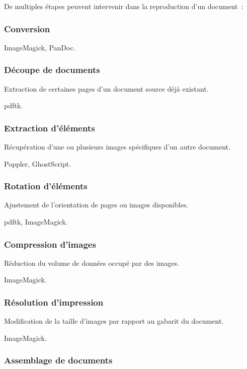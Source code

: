 De multiples étapes peuvent intervenir dans la reproduction d’un document :

\subsubsection{Conversion}

ImageMagick, PanDoc.

\subsubsection{Découpe de documents}

Extraction de certaines pages d’un document source déjà existant.

\gls{pdftk}.

\subsubsection{Extraction d’éléments}

Récupération d’une ou plusieurs images spécifiques d’un autre document.

Poppler, GhostScript.

\subsubsection{Rotation d’éléments}

Ajustement de l’orientation de pages ou images disponibles.

\gls{pdftk}, ImageMagick.

\subsubsection{Compression d’images}

Réduction du volume de données occupé par des images.

ImageMagick.

\subsubsection{Résolution d’impression}

Modification de la taille d’images par rapport au gabarit du document.

ImageMagick.

\subsubsection{Assemblage de documents}

